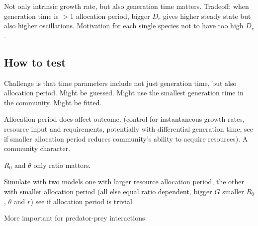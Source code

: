 \documentclass[12pt]{article}
\begin{document}
Not only intrinsic growth rate, but also generation time matters. Tradeoff: when generation time is $>1$ allocation period, bigger $D_r$ gives higher steady state but also higher oscillations. Motivation for each single species not to have too high $D_r$.

\subsection{How to test}
Challenge is that time parameters include not just generation time, but also allocation period. Might be guessed. Might use the smallest generation time in the community. Might be fitted. 

Allocation period does affect outcome. (control for instantaneous growth rates, resource input and requirements, potentially with differential generation time, see if smaller allocation period reduces community's ability to acquire resources). A community character. 

$R_0$ and $\theta$ only ratio matters.

Simulate with two models one with larger resource allocation period, the other with smaller allocation period (all else equal ratio dependent, bigger $G$ smaller $R_0$, $\theta$ and $r$) see if allocation period is trivial.

More important for predator-prey interactions
\end{document}
